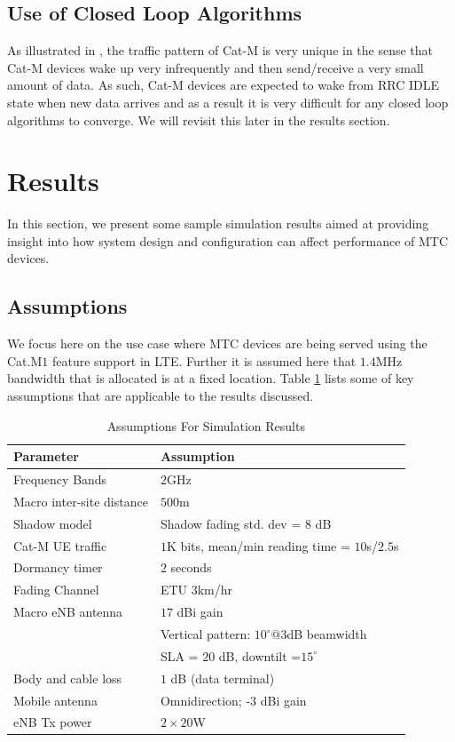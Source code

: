\documentclass[conference,compsoc]{IEEEtran}
\begin{document}
\subsection{Use of Closed Loop Algorithms}
As illustrated in \cite{36_888}, the traffic pattern of Cat-M is very unique in the sense that Cat-M devices wake up very infrequently and then send/receive a very small amount of data. As such, Cat-M devices are expected to wake from RRC IDLE state when new data arrives and as a result it is very difficult for any closed loop algorithms to converge. We will revisit this later in the results section. 

\section{Results}
	In this section, we present some sample simulation results aimed at providing insight into how system design and configuration can affect performance of MTC devices.

\subsection{Assumptions}
We focus here on the use case where MTC devices are being served using the Cat.M$1$ feature support in LTE. Further it is assumed here that $1.4$MHz bandwidth that is allocated is at a fixed location. Table \ref{table_assump} lists some of key assumptions that are applicable to the results discussed.

\begin{table}
    \begin{tabular}{|l|l|}
    \hline
        {\bf Parameter} & {\bf Assumption} \\ 
    \hline
    \hline
        Frequency Bands & $2$GHz \\
        \hline
        Macro inter-site distance & $500$m \\
\hline
    Shadow model & Shadow fading std. dev = $8$ dB \\
    \hline
    Cat-M UE traffic &	$1$K bits, mean/min reading time = $10$s/$2.5$s \\
        \hline
        Dormancy timer & $2$ seconds \\
    \hline
    Fading Channel  &	ETU $3$km/hr \\
        \hline
    Macro eNB antenna &	$17$ dBi gain \\
        & Vertical pattern: $10^{\circ}$@$3$dB beamwidth \\
        & SLA = $20$ dB, downtilt =$15^{\circ}$ \\
     \hline
    Body and cable loss	& $1$ dB (data terminal) \\
    \hline
    Mobile antenna	& Omnidirection; -3 dBi gain \\
    \hline
    eNB Tx power & 	$2 \times 20$W \\
    \hline
\end{tabular}
    \label{table_assump}
    \caption{Assumptions For Simulation Results}
\end{table}
\end{document}
